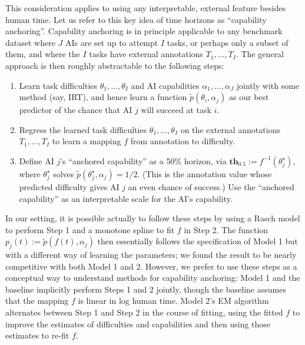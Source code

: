 \documentclass{article}
\theoremstyle{definition}
\newcommand{\thq}[1][q]{\mathbf{th}_{#1}}
\begin{document}
This consideration applies to using any interpretable, external feature besides human time. Let us refer to this key idea of time horizons as ``capability anchoring''. Capability anchoring is in principle applicable to any benchmark dataset where $J$ AIs are set up to attempt $I$ tasks, or perhaps only a subset of them, and where the $I$ tasks have external annotations $T_1, \dots, T_I$. The general approach is then roughly abstractable to the following steps: 
\begin{enumerate}
    \item Learn task difficulties $\theta_1, \dots, \theta_I$ and AI capabilities $\alpha_1, \dots, \alpha_J$  jointly with some method (say, IRT), and hence learn a function $\tilde p(\theta_i, \alpha_j)$ as our best predictor of the chance that AI $j$ will succeed at task $i$.
    \item Regress the learned task difficulties $\theta_1, \dots, \theta_I$ on the external annotations $T_1, \dots, T_I$ to learn a mapping $f$ from annotation to difficulty. 
\item Define AI $j$'s ``anchored capability'' as a 50\% horizon, via $\thq[0.5] := f^{-1}(\theta_j^\star)$, where $\theta_j^\star$ solves $\tilde p(\theta_j^\star, \alpha_j) = 1/2$. (This is the annotation value whose predicted difficulty gives AI $j$ an even chance of success.) Use the ``anchored capability'' as an interpretable scale for the AI's capability. 
\end{enumerate}
In our setting, it is possible actually to follow these steps by using a Rasch model to perform Step 1 and a monotone spline to fit $f$ in Step 2. The function $p_j(t) := \tilde p(f(t), \alpha_j)$ then essentially follows the specification of Model 1 but with a different way of learning the parameters; we found the result to be nearly competitive with both Model 1 and 2. However, we prefer to use these steps as a conceptual way to understand methods for capability anchoring: Model 1 and the baseline implicitly perform Steps 1 and 2 jointly, though the baseline assumes that the mapping $f$ is linear in log human time. Model 2's EM algorithm alternates between Step 1 and Step 2 in the course of fitting, using the fitted $f$ to improve the estimates of difficulties and capabilities and then using those estimates to re-fit $f$. 
\end{document}
